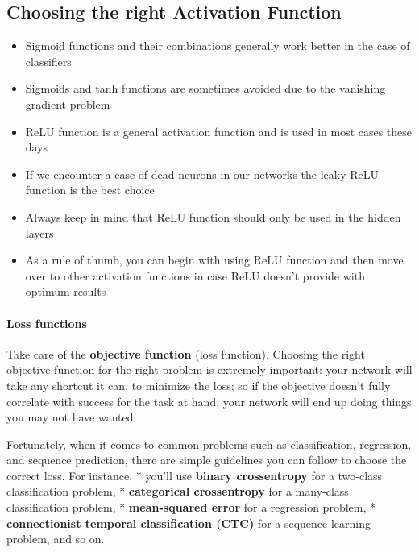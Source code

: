 \documentclass[11pt]{article}
\providecommand{\tightlist}{%
      \setlength{\itemsep}{0pt}\setlength{\parskip}{0pt}}
\begin{document}
\hypertarget{choosing-the-right-activation-function}{%
\subsection{Choosing the right Activation
Function}\label{choosing-the-right-activation-function}}

\begin{itemize}
\tightlist
\item
  Sigmoid functions and their combinations generally work better in the
  case of classifiers
\item
  Sigmoids and tanh functions are sometimes avoided due to the vanishing
  gradient problem
\item
  ReLU function is a general activation function and is used in most
  cases these days
\item
  If we encounter a case of dead neurons in our networks the leaky ReLU
  function is the best choice
\item
  Always keep in mind that ReLU function should only be used in the
  hidden layers
\item
  As a rule of thumb, you can begin with using ReLU function and then
  move over to other activation functions in case ReLU doesn't provide
  with optimum results
\end{itemize}

    \hypertarget{loss-functions}{%
\paragraph{Loss functions}\label{loss-functions}}

Take care of the \textbf{objective function} (loss function). Choosing
the right objective function for the right problem is extremely
important: your network will take any shortcut it can, to minimize the
loss; so if the objective doesn't fully correlate with success for the
task at hand, your network will end up doing things you may not have
wanted.

Fortunately, when it comes to common problems such as classification,
regression, and sequence prediction, there are simple guidelines you can
follow to choose the correct loss. For instance, * you'll use
\textbf{binary crossentropy} for a two-class classification problem, *
\textbf{categorical crossentropy} for a many-class classification
problem, * \textbf{mean-squared error} for a regression problem, *
\textbf{connectionist temporal classification (CTC)} for a
sequence-learning problem, and so on.
\end{document}
